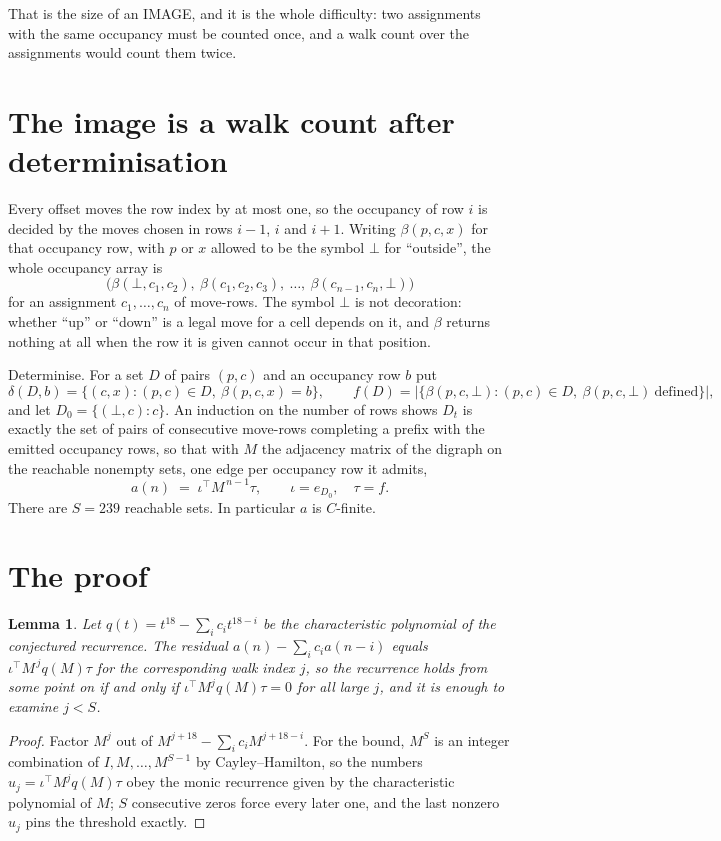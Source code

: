 \documentclass[11pt,a4paper]{article}
\theoremstyle{plain}
\newtheorem{lemma}[theorem]{Lemma}
\theoremstyle{definition}
\begin{document}
That is the size of an IMAGE, and it is the whole difficulty: two assignments with the same
occupancy must be counted once, and a walk count over the assignments would count them twice.

\section{The image is a walk count after determinisation}

Every offset moves the row index by at most one, so the occupancy of row $i$ is decided by the
moves chosen in rows $i-1$, $i$ and $i+1$. Writing $\beta(p,c,x)$ for that occupancy row, with
$p$ or $x$ allowed to be the symbol $\bot$ for ``outside'', the whole occupancy array is
\[
\bigl(\beta(\bot,c_1,c_2),\ \beta(c_1,c_2,c_3),\ \dots,\ \beta(c_{n-1},c_n,\bot)\bigr)
\]
for an assignment $c_1,\dots,c_n$ of move-rows. The symbol $\bot$ is not decoration: whether
``up'' or ``down'' is a legal move for a cell depends on it, and $\beta$ returns nothing at all
when the row it is given cannot occur in that position.

Determinise. For a set $D$ of pairs $(p,c)$ and an occupancy row $b$ put
\[
\delta(D,b)=\{(c,x):(p,c)\in D,\ \beta(p,c,x)=b\},\qquad
f(D)=\bigl|\{\beta(p,c,\bot):(p,c)\in D,\ \beta(p,c,\bot)\ \text{defined}\}\bigr| ,
\]
and let $D_0=\{(\bot,c):c\}$. An induction on the number of rows shows $D_t$ is exactly the
set of pairs of consecutive move-rows completing a prefix with the emitted occupancy rows, so
that with $M$ the adjacency matrix of the digraph on the reachable nonempty sets, one edge per
occupancy row it admits,
\[
a(n)\;=\;\iota^{\!\top}M^{\,n-1}\tau,\qquad \iota=e_{D_0},\quad \tau=f .
\]
There are $S=239$ reachable sets. In particular $a$ is $C$-finite.

\section{The proof}

\begin{lemma}\label{lem:crit}
Let $q(t)=t^{18}-\sum_i c_it^{18-i}$ be the characteristic polynomial of the
conjectured recurrence. The residual $a(n)-\sum_ic_ia(n-i)$ equals
$\iota^{\!\top}M^{\,j}q(M)\tau$ for the corresponding walk index $j$, so the recurrence
holds from some point on if and only if $\iota^{\!\top}M^{j}q(M)\tau=0$ for all large $j$,
and it is enough to examine $j<S$.
\end{lemma}

\begin{proof}
Factor $M^{j}$ out of $M^{j+18}-\sum_ic_iM^{j+18-i}$. For the bound, $M^{S}$
is an integer combination of $I,M,\dots,M^{S-1}$ by Cayley--Hamilton, so the numbers
$u_j=\iota^{\!\top}M^{j}q(M)\tau$ obey the monic recurrence given by the characteristic
polynomial of $M$; $S$ consecutive zeros force every later one, and the last nonzero $u_j$
pins the threshold exactly.
\end{proof}
\end{document}
